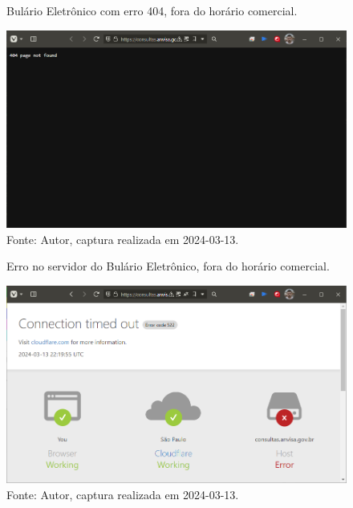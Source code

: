 \begin{frame}
	\begin{figure}
	    \centering
	    \caption*{Bulário Eletrônico com erro 404, fora do horário comercial.}
	    \includegraphics[height=0.7\textheight]{../pictures/Anvisa_error_404.png}
	    \caption*{Fonte: Autor, captura realizada em 2024-03-13.}
	\end{figure}
\end{frame}

\begin{frame}
	\begin{figure}
	    \centering
	    \caption*{Erro no servidor do Bulário Eletrônico, fora do horário comercial.}
	    \includegraphics[height=0.7\textheight]{../pictures/Anvisa_error_timeout.png}
	    \caption*{Fonte: Autor, captura realizada em 2024-03-13.}
	\end{figure}
\end{frame}

